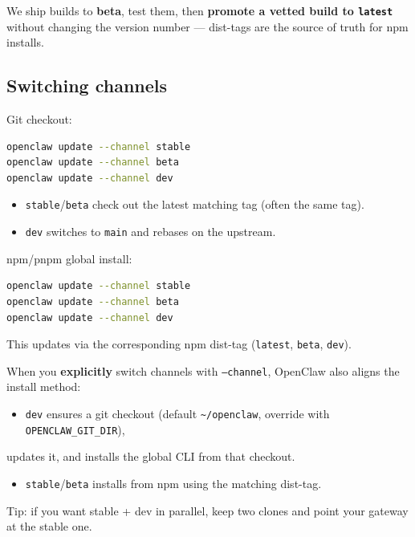 We ship builds to \textbf{beta}, test them, then \textbf{promote a vetted build to \texttt{latest}}
without changing the version number — dist-tags are the source of truth for npm installs.

\subsection{Switching channels}


Git checkout:

\begin{lstlisting}[language=bash]
openclaw update --channel stable
openclaw update --channel beta
openclaw update --channel dev
\end{lstlisting}


\begin{itemize}
  \item \texttt{stable}/\texttt{beta} check out the latest matching tag (often the same tag).
  \item \texttt{dev} switches to \texttt{main} and rebases on the upstream.
\end{itemize}


npm/pnpm global install:

\begin{lstlisting}[language=bash]
openclaw update --channel stable
openclaw update --channel beta
openclaw update --channel dev
\end{lstlisting}


This updates via the corresponding npm dist-tag (\texttt{latest}, \texttt{beta}, \texttt{dev}).

When you \textbf{explicitly} switch channels with \texttt{--channel}, OpenClaw also aligns
the install method:

\begin{itemize}
  \item \texttt{dev} ensures a git checkout (default \texttt{\textasciitilde{}/openclaw}, override with \texttt{OPENCLAW\_GIT\_DIR}),
\end{itemize}

updates it, and installs the global CLI from that checkout.
\begin{itemize}
  \item \texttt{stable}/\texttt{beta} installs from npm using the matching dist-tag.
\end{itemize}


Tip: if you want stable + dev in parallel, keep two clones and point your gateway at the stable one.

